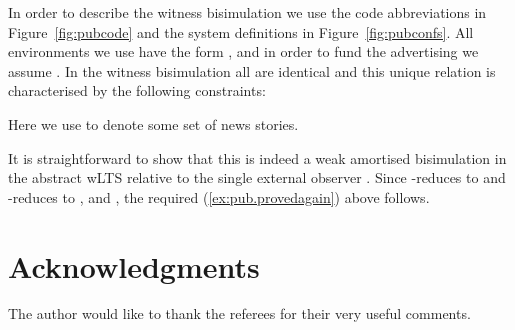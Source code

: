 \documentclass{LMCS}
\begin{document}
In order to describe the witness bisimulation we use the code abbreviations in Figure~\ref{fig:pubcode} and the  
system definitions in Figure~\ref{fig:pubconfs}. All environments we use have the form 
, and in order to fund the advertising we assume . 
In the witness bisimulation 
 all  are identical and this unique relation  is characterised by the following
constraints:

Here we use  to denote some set of news stories.

It is straightforward to show that this is indeed a weak amortised bisimulation in the abstract wLTS relative to the single
external observer . Since  -reduces to 
and  -reduces to , and 
, the required (\ref{ex:pub.provedagain}) above
follows. 

\section*{Acknowledgments}
The author would like to thank the referees for their very useful comments. 





 
\end{document}
